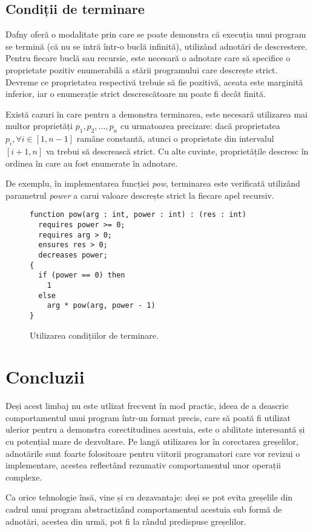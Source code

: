 \subsection{Condiții de terminare}
\label{Condiții de terminare}
Dafny oferă o modalitate prin care se poate demonstra că execuția unui program se termină (că nu se intră într-o buclă infinită), utilizând adnotări de descrestere. Pentru fiecare buclă sau recursie, este necesară o adnotare care să specifice o proprietate pozitiv enumerabilă a stării programului care descrește strict. Devreme ce proprietatea respectivă trebuie să fie pozitivă, aceata este marginită inferior, iar o enumerație strict descrescătoare nu poate fi decât finită.

Există cazuri în care pentru a demonstra terminarea, este necesară utilizarea mai multor proprietăți $p_1, p_2, ..., p_n$ cu urmatoarea precizare: dacă proprietatea $p_i, \forall i \in [1, n-1]$ ramâne constantă, atunci o proprietate din intervalul $[i+1, n]$ va trebui să descrească strict. Cu alte cuvinte, proprietățile descresc în ordinea în care au fost enumerate în adnotare.

De exemplu, în implementarea funcției \textit{pow}, terminarea este verificată utilizând parametrul \textit{power} a carui valoare descrește strict la fiecare apel recursiv.

\begin{figure}[H]
    \caption{Utilizarea condițiilor de terminare.	}

\begin{Verbatim}[fontsize=\small, frame=single,baselinestretch=0.1]
function pow(arg : int, power : int) : (res : int)
  requires power >= 0;
  requires arg > 0;
  ensures res > 0;
  decreases power; 
{
  if (power == 0) then
    1
  else
    arg * pow(arg, power - 1)
}
\end{Verbatim}

\end{figure}

\section{Concluzii}

Deși acest limbaj nu este utlizat frecvent în mod practic, ideea de a deascrie comportamentul unui program într-un format precis, care să poată fi utilizat ulerior pentru a  demonstra corectitudinea acestuia, este o abilitate interesantă și cu potențial mare de dezvoltare. Pe langă utilizarea lor în corectarea greșelilor, adnotările sunt foarte folositoare pentru viitorii programatori care vor revizui o implementare, acestea reflectând rezumativ comportamentul unor operații complexe.

Ca orice tehnologie însă, vine și cu dezavantaje: deși se pot evita greșelile din cadrul unui program abstractizând comportamentul acestuia sub formă de adnotări, acestea din urmă, pot fi la rândul predispuse greșelilor.



